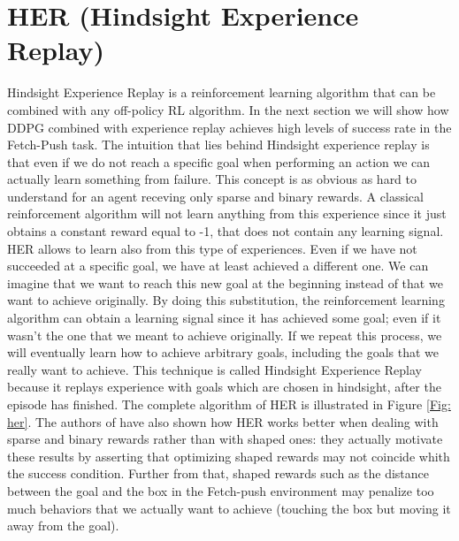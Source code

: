 \documentclass[a4paper]{report}
\begin{document}
\section{HER (Hindsight Experience Replay)}
Hindsight Experience Replay is a reinforcement learning algorithm that can be combined with any off-policy RL algorithm. In the next section we will show how DDPG combined with experience replay achieves high levels of success rate in the Fetch-Push task. The intuition that lies behind Hindsight experience replay is that even if we do not reach a specific goal when performing an action we can actually learn something from failure. This concept is as obvious as hard to understand for an agent receving only sparse and binary rewards. 
 A classical reinforcement algorithm will not learn anything from this experience since it just obtains a constant reward equal to -1, that does not contain any learning signal. HER allows to learn also from this type of experiences. Even if we have not succeeded at a specific goal, we have at least achieved a different one. We can imagine that we want to reach this new goal at the beginning instead of that we want to achieve originally. By doing this substitution, the reinforcement learning algorithm can obtain a learning signal since it has achieved some goal; even if it wasn't the one that we meant to achieve originally. If we repeat this process, we will eventually learn how to achieve arbitrary goals, including the goals that we really want to achieve. This technique is called Hindsight Experience Replay because it replays experience with goals which are chosen in hindsight, after the episode has finished. The complete algorithm of HER is illustrated in Figure \ref{Fig: her}. The authors of \cite{her} have also shown how HER works better when dealing with sparse and binary rewards rather than with shaped ones: they actually motivate these results by asserting that optimizing shaped rewards may not coincide whith the success condition. Further from that, shaped rewards such as the distance between the goal and the box in the Fetch-push environment may penalize too much behaviors that we actually want to achieve (touching the box but moving it away from the goal).
\end{document}
